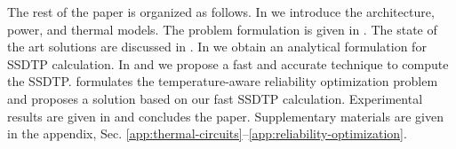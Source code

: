 The rest of the paper is organized as follows. In  we introduce the architecture, power, and thermal models. The problem formulation is given in . The state of the art solutions are discussed in . In  we obtain an analytical formulation for SSDTP calculation. In  and  we propose a fast and accurate technique to compute the SSDTP.  formulates the temperature-aware reliability optimization problem and proposes a solution based on our fast SSDTP calculation. Experimental results are given in  and  concludes the paper. Supplementary materials are given in the appendix, Sec. \ref{app:thermal-circuits}--\ref{app:reliability-optimization}.
